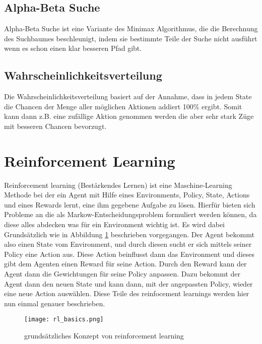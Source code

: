 \subsection{Alpha-Beta Suche}
Alpha-Beta Suche ist eine Variante des Minimax Algorithmus, die die Berechnung des Suchbaumes beschleunigt, indem sie bestimmte Teile der Suche nicht ausführt wenn es schon einen klar besseren Pfad gibt.

\subsection{Wahrscheinlichkeitsverteilung}
Die Wahrscheinlichkeitsverteilung basiert auf der Annahme, dass in jedem State die Chancen der Menge aller möglichen Aktionen addiert 100\% ergibt. Somit kann dann z.B. eine zufällige Aktion genommen werden die aber sehr stark Züge mit besseren Chancen bevorzugt.

\section{Reinforcement Learning}
Reinforcement learning (Bestärkendes Lernen) ist eine Maschine-Learning Methode bei der ein Agent mit Hilfe eines Environments, Policy, State, Actions und eines Rewards lernt, eine ihm gegebene Aufgabe zu lösen. Hierfür bieten sich Probleme an die als Markow-Entscheidungsproblem\cite{Martijn2012} formuliert werden können, da diese alles abdecken was für ein Environment wichtig ist. Es wird dabei Grundsätzlich wie in Abbildung \ref{fig:rl_basic} beschrieben vorgegangen. Der Agent bekommt also einen State vom Environment, und durch diesen sucht  er sich mittels seiner Policy eine Action aus. Diese Action beinflusst dann das Environment und dieses gibt dem Agenten einen Reward für seine Action. Durch den Reward kann der Agent dann die Gewichtungen für seine Policy anpassen. Dazu bekommt der Agent dann den neuen State und kann dann, mit der angepassten Policy, wieder eine neue Action auswählen. Diese Teile des reinfocement learnings werden hier nun einmal genauer beschrieben.\\

\begin{figure}[h!]
  \texttt{[image: rl\_basics.png]}
  \centering
  \caption{grundsätzliches Konzept von reinforcement learning}
  \label{fig:rl_basic}
\end{figure}

